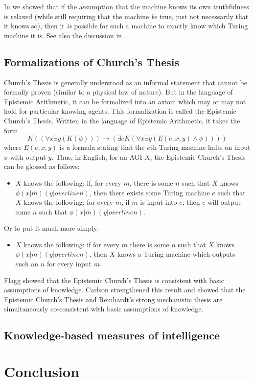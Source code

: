 \documentclass[runningheads]{llncs}
\begin{document}
In \cite{alexander2014machine} we showed that if the assumption that the
machine knows its own truthfulness is relaxed (while still requiring that
the machine \emph{be} true, just not necessarily that it knows so),
then it \emph{is} possible for such a machine to exactly know which
Turing machine it is. See also the discussion in \cite{aldini2015theory}.



\subsection{Formalizations of Church's Thesis}

Church's Thesis is generally understood as an informal statement that cannot
be formally proven (similar to a physical law of nature).
But in the language of Epistemic Arithmetic, it can be formalized into an
axiom which may or may not hold for particular knowing agents. This formalization
is called the Epistemic Church's Thesis. Written in the language of Epistemic
Arithmetic, it takes the form
\[
  K( ( \forall x\exists y (K(\phi))  ) \rightarrow
  ( \exists e K( \forall x\exists y ( E(e,x,y) \wedge \phi  )  )  )  )
\]
where $E(e,x,y)$ is a formula stating that the $e$th Turing machine
halts on input $x$ with output $y$.
Thus, in English, for an AGI $X$,
the Epistemic Church's Thesis can be glossed as follows:
\begin{itemize}
  \item
  $X$ knows the following: if, for every $m$, there is some $n$ such that
  $X$ knows $\phi(x|\overline m)(y|overline n)$, then there exists some
  Turing machine $e$ such that $X$ knows the following:
  for every $m$, if $m$ is input into $e$, then $e$ will output
  some $n$ such that $\phi(x|\overline m)(y|overline n)$.
\end{itemize}
Or to put it much more simply:
\begin{itemize}
  \item
  $X$ knows the following: if for every $m$ there is some $n$ such that
  $X$ knows $\phi(x|\overline m)(y|overline n)$, then $X$ knows a Turing
  machine which outputs such an $n$ for every input $m$.
\end{itemize}
Flagg showed \cite{flagg1985church} that the Epistemic Church's Thesis is
consistent with basic assumptions of knowledge. Carlson strengthened this
result and showed \cite{carlson2016collapsing} that the Epistemic Church's
Thesis and Reinhardt's strong mechanistic thesis are simultaneously
co-consistent with basic assumptions of knowledge.

\subsection{Knowledge-based measures of intelligence}

\cite{alexander2019measuring}
\cite{alexander2020agi}

\section{Conclusion}
\label{conclusionsection}



\end{document}
